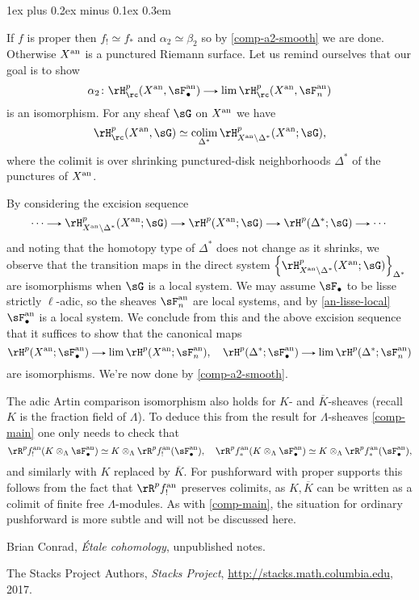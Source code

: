\documentclass[11pt,leqno]{article}
\makeatletter
\newcommand{\thmheadfont}{\scshape}
\newcommand{\thmhorizspace}{0.3em}
\newcommand{\thmsep}{\hspace{\thmhorizspace}---}
\renewenvironment{proof}[1][Proof]{\par
  \pushQED{\qed}%
  \normalfont%
  \topsep1ex plus 0.2ex minus 0.1ex\relax%
  \labelsep \thmhorizspace\relax%
  \trivlist
  \item[\hskip\labelsep\thmheadfont#1\@addpunct{\thmsep}]\ignorespaces
}{%
  \popQED\endtrivlist\@endpefalse%
}
\theoremstyle{block}
\numberwithin{subblock}{block}
\numberwithin{equation}{subblock}
\newcommand{\arrlen}{1.25em}
\renewcommand{\to}{\mathrel{\tikz[baseline]%
    \draw[>=stealth,->](0,0.5ex)--(\arrlen,0.5ex);}}
\renewcommand{\l}{\left}
\renewcommand{\r}{\right}
\renewcommand{\o}{\overline}
\renewcommand{\c}{\colon}
\newcommand{\iso}{\simeq}
\newcommand{\colim}{\operatorname*{colim}}
\numberwithin{block}{section}
\makeatother
\begin{document}
\begin{nothing}
\begin{proof}[Proof of \cref{comp-main} for $\alpha_2$]
    If $f$ is proper then $f_! \iso f_*$ and $\alpha_2 \iso \beta_2$ so by \cref{comp-a2-smooth} we are done. Otherwise $X^{\mathrm{an}}$ is a punctured Riemann surface. Let us remind ourselves that our goal is to show
    \[
      \alpha_2 \c \rH_\rc^p(X^\an, \sF_\bullet^\an) \to \lim \rH_\rc^p(X^\an, \sF_n^\an)
    \]
    is an isomorphism. For any sheaf $\sG$ on $X^{\mathrm{an}}$ we have
    \[
      \rH_\rc^p(X^\an,\sG) \iso \colim_{\Delta^*} \rH_{X^\an \setminus \Delta^*}^p(X^\an; \sG),
    \]
    where the colimit is over shrinking punctured-disk neighborhoods $\Delta^*$ of the punctures of $X^{\mathrm{an}}$.

    By considering the excision sequence
    \[
      \cdots \to \rH_{X^\an \setminus \Delta^*}^p(X^\an; \sG) \to \rH^p(X^\an; \sG) \to \rH^p(\Delta^*; \sG) \to \cdots
    \]
    and noting that the homotopy type of $\Delta^*$ does not change as it shrinks, we observe that the transition maps in the direct system $\l\{\rH_{X^\an \setminus \Delta^*}^p(X^\an; \sG)\r\}_{\Delta^*}$ are isomorphisms when $\sG$ is a local system. We may assume $\sF_\bullet$ to be lisse strictly $\ell$-adic, so the sheaves $\sF_n^\an$ are local systems, and by \cref{an-lisse-local} $\sF_\bullet^\an$ is a local system. We conclude from this and the above excision sequence that it suffices to show that the canonical maps
    \[
      \rH^p(X^\an;\sF_\bullet^\an) \to \lim \rH^p(X^\an;\sF_n^\an), \quad
      \rH^p(\Delta^*;\sF_\bullet^\an) \to \lim \rH^p(\Delta^*;\sF_n^\an)
    \]
    are isomorphisms. We're now done by \cref{comp-a2-smooth}.
  \end{proof}
\end{nothing}

\begin{remark}
  \label{comp-K}
  The adic Artin comparison isomorphism also holds for $K$- and $\o K$-sheaves (recall $K$ is the fraction field of $\Lambda$). To deduce this from the result for $\Lambda$-sheaves \cref{comp-main} one only needs to check that
  \[
    \rR^pf^\an_!(K \otimes_\Lambda \sF_\bullet^\an) \iso K \otimes_\Lambda \rR^pf^\an_!(\sF_\bullet^\an), \quad
    \rR^pf^\an_*(K \otimes_\Lambda \sF_\bullet^\an) \iso K \otimes_\Lambda \rR^pf^\an_*(\sF_\bullet^\an),
  \]
  and similarly with $K$ replaced by $\o K$. For pushforward with proper supports this follows from the fact that $\rR^pf^\an_!$ preserves colimits, as $K,\o K$ can be written as a colimit of finite free $\Lambda$-modules. As with \cref{comp-main}, the situation for ordinary pushforward is more subtle and will not be discussed here.
\end{remark}


\begin{thebibliography}{BrTIII}

 Brian Conrad, \emph{\'Etale cohomology}, unpublished notes.

 The Stacks Project Authors, \emph{Stacks Project}, \url{http://stacks.math.columbia.edu}, 2017.

\end{thebibliography}
\end{document}
